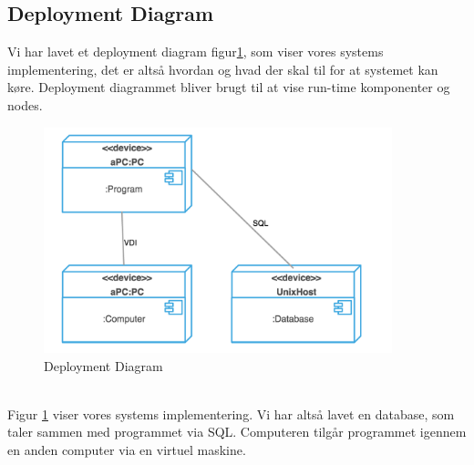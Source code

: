 \documentclass[a4paper]{article}
\begin{document}
\subsection{Deployment Diagram}
Vi har lavet et deployment diagram figur\ref{fig:DEP}, som viser vores systems implementering, det er altså hvordan og hvad der skal til for at systemet kan køre. Deployment diagrammet bliver brugt til at vise run-time komponenter og nodes. \cite[p~256]{OOSE}\\
\begin{figure}[h!]
\includegraphics[width=0.9\textwidth]{deploymentdiagram}
  \caption{Deployment Diagram}
    \label{fig:DEP}
  \centering
\end{figure} \\
Figur \ref{fig:DEP} viser vores systems implementering. Vi har altså lavet en database, som taler sammen med programmet via SQL. Computeren tilgår programmet igennem en anden computer via en virtuel maskine. \\
\end{document}
